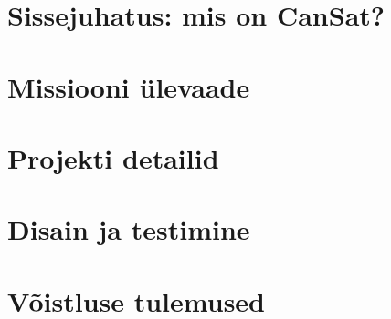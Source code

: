 \chapter*{Sissejuhatus: mis on CanSat?}\label{peatükk:sissejuhatus}


\chapter{Missiooni ülevaade}\label{peatükk:1}


\chapter{Projekti detailid}\label{peatükk:2}


\chapter{Disain ja testimine}\label{peatükk:3}


\chapter{Võistluse tulemused}\label{peatükk:4}


